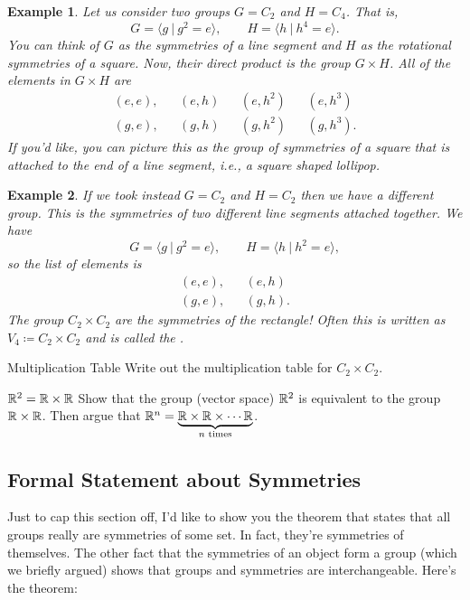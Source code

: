 \documentclass{article}
\theoremstyle{indented}
\newtheorem{example}{Example}
\begin{document}
\begin{example}
    Let us consider two groups $G=C_2$ and $H=C_4$. That is,
    \[
        G=\langle g~\vert~ g^2=e \rangle, \qquad H=\langle h ~\vert~ h^4=e \rangle.
    \]
    You can think of $G$ as the symmetries of a line segment and $H$ as the rotational symmetries of a square. Now, their direct product is the group $G\times H$. All of the elements in $G\times H$ are
    \begin{align*}
    (e,e), && (e,h) && (e,h^2) && (e,h^3)\\
    (g,e), && (g,h) && (g,h^2) && (g,h^3).
    \end{align*}
If you'd like, you can picture this as the group of symmetries of a square that is attached to the end of a line segment, i.e., a square shaped lollipop.
\end{example}

\begin{example}
    If we took instead $G=C_2$ and $H=C_2$ then we have a different group. This is the symmetries of two different line segments attached together. We have
    \[
        G=\langle g~\vert~ g^2=e \rangle, \qquad H=\langle h ~\vert~ h^2=e \rangle,
    \]
    so the list of elements is
    \begin{align*}
    (e,e), && (e,h)\\
    (g,e), && (g,h).
    \end{align*}
    The group $C_2 \times C_2$ are the symmetries of the rectangle! Often this is written as $V_4 \coloneqq C_2\times C_2$ and is called the .
\end{example}

\begin{problem}{Multiplication Table}{}
Write out the multiplication table for $C_2 \times C_2$.
\end{problem}

\begin{problem}{$\mathbb{R}^2=\mathbb{R}\times \mathbb{R}$}{}
Show that the group (vector space) $\mathbb{R}^2$ is equivalent to the group $\mathbb{R}\times \mathbb{R}$. Then argue that $\mathbb{R}^n = \underbrace{\mathbb{R}\times \mathbb{R} \times \cdots \mathbb{R}}_{\textrm{$n$ times}}$.
\end{problem}

\subsection{Formal Statement about Symmetries}

Just to cap this section off, I'd like to show you the theorem that states that all groups really are symmetries of some set. In fact, they're symmetries of themselves. The other fact that the symmetries of an object form a group (which we briefly argued) shows that groups and symmetries are interchangeable. Here's the theorem:
\end{document}
